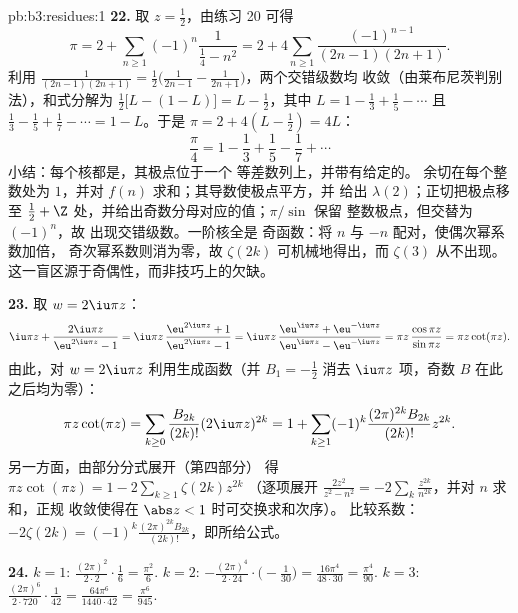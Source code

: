 \begin{solution}{pb:b3:residues:1}
\textbf{22.} 取 $z = \frac12$，由练习 20 可得
\[
\pi = 2 + \sum_{n\geq1}(-1)^n\frac{1}{\frac14 - n^2}
= 2 + 4\sum_{n\geq1}\frac{(-1)^{n-1}}{(2n-1)(2n+1)} .
\]
利用 $\frac1{(2n-1)(2n+1)} = \frac12\bigl(\frac1{2n-1} -
\frac1{2n+1}\bigr)$，两个交错级数均
收敛（由莱布尼茨判别法），和式分解为 $\frac12\bigl[L -
(1 - L)\bigr] = L - \frac12$，其中 $L = 1 - \frac13 +
\frac15 - \cdots$ 且 $\frac13 - \frac15 + \frac17 - \cdots
= 1 - L$。于是 $\pi = 2 + 4(L - \frac12) = 4L$：
\[
\frac\pi4 = 1 - \frac13 + \frac15 - \frac17 + \cdots
\]
小结：每个核都是，其极点位于一个
等差数列上，并带有给定的。
余切在每个整数处为 $1$，并对
$f(n)$ 求和；其导数使极点平方，并
给出 $\lambda(2)$；正切把极点移至
$\frac12 + \Z$ 处，并给出奇数分母对应的值；$\pi/\sin$ 保留
整数极点，但交替为 $(-1)^n$，故
出现交错级数。一阶核全是
奇函数：将 $n$ 与 $-n$ 配对，使偶次幂系数加倍，
奇次幂系数则消为零，故 $\zeta(2k)$
可机械地得出，而 $\zeta(3)$ 从不出现。
这一盲区源于奇偶性，而非技巧上的欠缺。

\textbf{23.} 取 $w = 2\iu\pi z$：
\[
\iu\pi z + \frac{2\iu\pi z}{\eu^{2\iu\pi z} - 1}
= \iu\pi z\,\frac{\eu^{2\iu\pi z} + 1}{\eu^{2\iu\pi z} - 1}
= \iu\pi z\,\frac{\eu^{\iu\pi z} +
\eu^{-\iu\pi z}}{\eu^{\iu\pi z} - \eu^{-\iu\pi z}}
= \pi z\,\frac{\cos\pi z}{\sin\pi z} = \pi z\cot(\pi z) .
\]
由此，对 $w = 2\iu\pi z$ 利用生成函数（并
$B_1 = -\frac12$ 消去 $\iu\pi z$ 项，奇数 $B$
在此之后均为零）：
\[
\pi z\cot(\pi z) = \sum_{k\geq0}\frac{B_{2k}}{(2k)!}
(2\iu\pi z)^{2k}
= 1 + \sum_{k\geq1}(-1)^k\frac{(2\pi)^{2k}B_{2k}}{(2k)!}
z^{2k} .
\]
另一方面，由部分分式展开（第四部分）
得 $\pi z\cot(\pi z) = 1 - 2\sum_{k\geq1}\zeta(2k)z^{2k}$
（逐项展开 $\frac{2z^2}{z^2 - n^2} =
-2\sum_k\frac{z^{2k}}{n^{2k}}$，并对 $n$ 求和，正规
收敛使得在 $\abs z < 1$ 时可交换求和次序）。
比较系数：$-2\zeta(2k) =
(-1)^k\frac{(2\pi)^{2k}B_{2k}}{(2k)!}$，即所给公式。

\textbf{24.} $k = 1$: $\frac{(2\pi)^2}{2\cdot2}\cdot\frac16
= \frac{\pi^2}6$. $k = 2$: $-\frac{(2\pi)^4}{2\cdot24}
\cdot\bigl(-\frac1{30}\bigr) = \frac{16\pi^4}{48\cdot30} =
\frac{\pi^4}{90}$. $k = 3$: $\frac{(2\pi)^6}{2\cdot720}
\cdot\frac1{42} = \frac{64\pi^6}{1440\cdot42} =
\frac{\pi^6}{945}$.


\end{solution}
